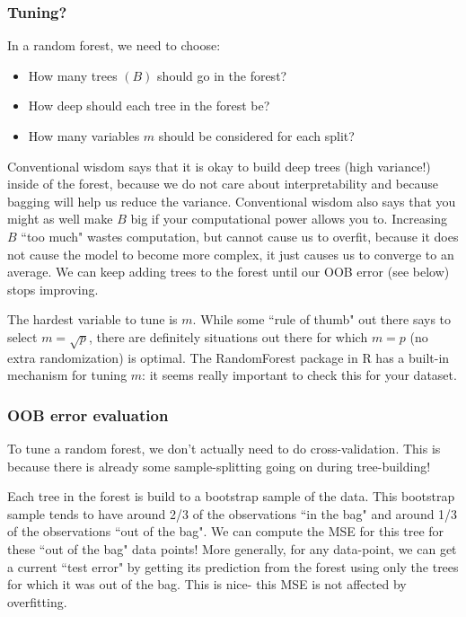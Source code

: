 \subsubsection{Tuning?}

In a random forest, we need to choose:
\begin{itemize}
\item How many trees $(B)$ should go in the forest?
\item How deep should each tree in the forest be?
\item How many variables $m$ should be considered for each split?	
\end{itemize}

Conventional wisdom says that it is okay to build deep trees (high variance!) inside of the forest, because we do not care about interpretability and because bagging will help us reduce the variance. Conventional wisdom also says that you might as well make $B$ big if your computational power allows you to. Increasing $B$ ``too much" wastes computation, but cannot cause us to overfit, because it does not cause the model to become more complex, it just causes us to converge to an average. We can keep adding trees to the forest until our OOB error (see below) stops improving. 

The hardest variable to tune is $m$. While some ``rule of thumb" out there says to select $m = \sqrt{p}$, there are definitely situations out there for which $m=p$ (no extra randomization) is optimal. The RandomForest package in R has a built-in mechanism for tuning $m$: it seems really important to check this for your dataset. 

\subsubsection{OOB error evaluation}

To tune a random forest, we don't actually need to do cross-validation. This is because there is already some sample-splitting going on during tree-building! 

Each tree in the forest is build to a bootstrap sample of the data. This bootstrap sample tends to have around 2/3 of the observations ``in the bag" and around 1/3 of the observations ``out of the bag". We can compute the MSE for this tree for these ``out of the bag" data points! More generally, for any data-point, we can get a current ``test error" by getting its prediction from the forest using only the trees for which it was out of the bag. This is nice- this MSE is not affected by overfitting. 


